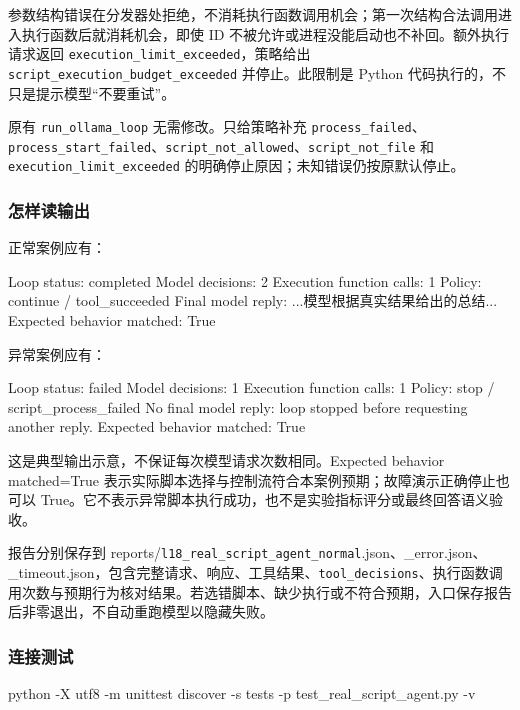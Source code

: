 \documentclass[UTF8,zihao=-4,fontset=fandol]{ctexart}
\begin{document}
参数结构错误在分发器处拒绝，不消耗执行函数调用机会；第一次结构合法调用进入执行函数后就消耗机会，即使 ID 不被允许或进程没能启动也不补回。额外执行请求返回 \nolinkurl{execution_limit_exceeded}，策略给出 \nolinkurl{script_execution_budget_exceeded} 并停止。此限制是 Python 代码执行的，不只是提示模型“不要重试”。

原有 \nolinkurl{run_ollama_loop} 无需修改。只给策略补充 \nolinkurl{process_failed}、\nolinkurl{process_start_failed}、\nolinkurl{script_not_allowed}、\nolinkurl{script_not_file} 和 \nolinkurl{execution_limit_exceeded} 的明确停止原因；未知错误仍按原默认停止。

\subsubsection{怎样读输出}

正常案例应有：

\begin{Code}
Loop status: completed
Model decisions: 2
Execution function calls: 1
Policy: continue / tool_succeeded
Final model reply: ...模型根据真实结果给出的总结...
Expected behavior matched: True
\end{Code}

异常案例应有：

\begin{Code}
Loop status: failed
Model decisions: 1
Execution function calls: 1
Policy: stop / script_process_failed
No final model reply: loop stopped before requesting another reply.
Expected behavior matched: True
\end{Code}

这是典型输出示意，不保证每次模型请求次数相同。Expected behavior matched=True 表示实际脚本选择与控制流符合本案例预期；故障演示正确停止也可以 True。它不表示异常脚本执行成功，也不是实验指标评分或最终回答语义验收。

报告分别保存到 reports/\nolinkurl{l18_real_script_agent_normal}.json、\_error.json、\_timeout.json，包含完整请求、响应、工具结果、\nolinkurl{tool_decisions}、执行函数调用次数与预期行为核对结果。若选错脚本、缺少执行或不符合预期，入口保存报告后非零退出，不自动重跑模型以隐藏失败。

\subsubsection{连接测试}

\begin{Code}
python -X utf8 -m unittest discover -s tests -p test_real_script_agent.py -v
\end{Code}
\end{document}
